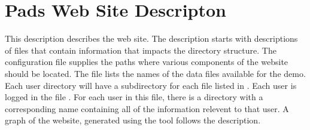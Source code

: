 \documentclass[nocopyrightspace,natbib,onecolumn,9pt]{sigplanconf}
\begin{document}
\section{Pads Web Site Descripton}
This \forest{} description describes the \pads{} web site. The
description starts with \pads{} descriptions of files that contain
information that impacts the directory structure. The
configuration file supplies the paths where various components of the
website should be located.  The  file lists the names
of the data files available for the demo.  Each user directory will
have a subdirectory for each file listed in . Each
user is logged in the file .  For each user in this
file, there is a directory with a corresponding name containing all of
the information relevent to that user.  A graph
of the \pads{} website, generated using the  tool
follows the description.

\newpage
\end{document}
